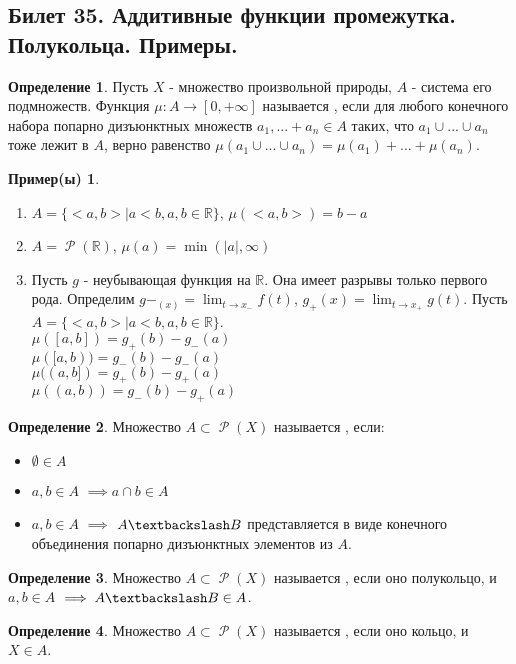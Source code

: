 \documentclass[a4paper]{article}
\theoremstyle{indented}
\theoremstyle{definition}
\newtheorem{defn}{Определение}
\newtheorem{exl}{Пример(ы)}
\theoremstyle{remark}
\DeclareMathOperator{\ra}{\rightarrow}
\DeclareMathOperator{\Rho}{\mathcal{P}}
\begin{document}
\subsection{Билет 35. Аддитивные функции промежутка. Полукольца. Примеры.}
\begin{defn}
Пусть $X$ - множество произвольной природы, $A$ - система его подмножеств. Функция $\mu: A \ra [0, +\infty]$ называется , если для любого конечного набора попарно дизъюнктных множеств $a_1, ... +a_n \in A$ таких, что $a_1 \cup ... \cup a_n$ тоже лежит в $A$, верно равенство $\mu(a_1 \cup ... \cup a_n)=\mu(a_1)+...+\mu(a_n)$.
\end{defn}
\begin{exl}
\begin{enumerate}
Во всех примерах $X=\mathbb{R}$
    \item $A=\{<a, b> | a<b, a, b \in \mathbb{R}\}$, $\mu(<a, b>)=b-a$
    \item $A=\Rho(\mathbb{R})$, $\mu(a)=\min(|a|, \infty)$
    \item Пусть $g$ - неубывающая функция на $\mathbb{R}$. Она имеет разрывы только первого рода. Определим $g-_(x)=\lim_{t \ra x_-} f(t)$, $g_+(x)=\lim_{t \ra x_+} g(t)$. Пусть $A=\{<a, b> | a<b, a, b \in \mathbb{R}\}$.
    \\
    $\mu([a, b])=g_+(b)-g_-(a)$
    \\
    $\mu([a, b))=g_-(b)-g_-(a)$
    \\
    $\mu((a, b])=g_+(b)-g_+(a)$
    \\
    $\mu((a, b))=g_-(b)-g_+(a)$
\end{enumerate}
\end{exl}
\begin{defn}
Множество $A \subset \Rho(X)$ называется , если:
\begin{itemize}
    \item $\emptyset \in A$
    \item $a, b \in A$ $\implies a \cap b \in A$
    \item $a, b \in A$ $\implies $ $A \textbackslash B$ представляется в виде конечного объединения попарно дизъюнктных элементов из $A$.
\end{itemize}
\end{defn}
\begin{defn}
Множество $A \subset \Rho(X)$ называется , если оно полукольцо, и $a, b \in A$ $\implies A \textbackslash B \in A$.
\end{defn}
\begin{defn}
Множество $A \subset \Rho(X)$ называется , если оно кольцо, и $X \in A$.
\end{defn}
\end{document}

